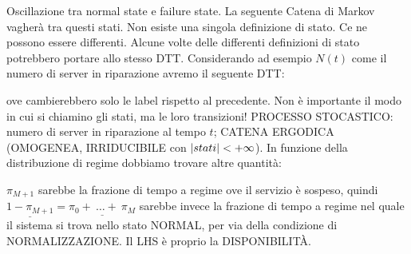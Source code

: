 Oscillazione tra normal state e failure state. La seguente Catena di Markov vagherà tra questi stati. Non esiste una singola definizione di stato. Ce ne possono essere differenti. Alcune volte delle differenti definizioni di stato potrebbero portare allo stesso DTT. Considerando ad esempio $N(t)$ come il numero di server in riparazione avremo il seguente DTT:

\begin{center}
\end{center}


ove cambierebbero solo le label rispetto al precedente.
Non è importante il modo in cui si chiamino gli stati, ma le loro transizioni! PROCESSO STOCASTICO: numero di server in riparazione al tempo $t$; CATENA ERGODICA (OMOGENEA, IRRIDUCIBILE con $\left\vert{stati}\right\vert<+\infty$). In funzione della distribuzione di regime dobbiamo trovare altre quantità:

$\pi_{M+1}$ sarebbe la frazione di tempo a regime ove il servizio è sospeso, quindi $\underline{1-\pi_{M+1}} = \underline{\pi_0+\ \dots+\ \pi_M}$ sarebbe invece la frazione di tempo a regime nel quale il sistema si trova nello stato NORMAL, per via della condizione di NORMALIZZAZIONE. Il LHS è proprio la DISPONIBILIT\`A.

